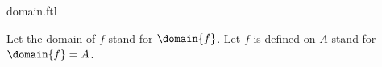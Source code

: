 \documentclass{article}
\begin{document}
\begin{smodule}[creators={Marcel Schütz}]{domain.ftl}
  \begin{fconvention*}
    Let the domain of $f$ stand for $\domain{f}$.
    Let $f$ is defined on $A$ stand for $\domain{f} = A$.
  \end{fconvention*}
\end{smodule}
\end{document}
